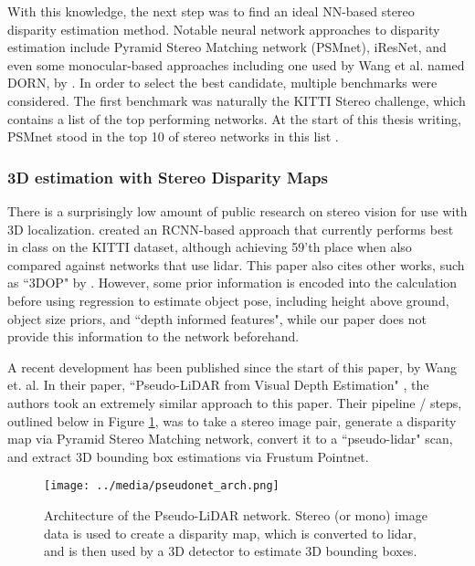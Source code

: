 With this knowledge, the next step was to find an ideal NN-based stereo disparity estimation method. Notable neural network approaches to disparity estimation include Pyramid Stereo Matching network (PSMnet),  iResNet, and even some monocular-based approaches including one used by Wang et al. named DORN, by  \cite{fu_deep_2018}. In order to select the best candidate, multiple benchmarks were considered. The first benchmark was naturally the KITTI Stereo challenge, which contains a list of the top performing networks. At the start of this thesis writing, PSMnet stood in the top 10 of stereo networks in this list \cite{menze_kitti_2019}.

\subsubsection{3D estimation with Stereo Disparity Maps}
There is a surprisingly low amount of public research on stereo vision for use with 3D localization. \cite{li_stereo_2019} created an RCNN-based approach that currently performs best in class on the KITTI dataset, although achieving 59'th place when also compared against networks that use lidar. This paper also cites other works, such as ``3DOP" by \cite{chen_3d_2016}. However, some prior information is encoded into the calculation before using regression to estimate object pose, including height above ground, object size priors, and ``depth informed features", while our paper does not provide this information to the network beforehand.

A recent development has been published since the start of this paper, by Wang et. al. In their paper, ``Pseudo-LiDAR from Visual Depth Estimation" \cite{wang_pseudo-lidar_2019}, the authors took an extremely similar approach to this paper. Their pipeline / steps, outlined below in Figure \ref{pseudonet_arch}, was to take a stereo image pair, generate a disparity map via Pyramid Stereo Matching network, convert it to a ``pseudo-lidar" scan, and extract 3D bounding box estimations via Frustum Pointnet. \\

\begin{figure}[ht]
    \texttt{[image: ../media/pseudonet\_arch.png]}
    \caption{Architecture of the Pseudo-LiDAR network. Stereo (or mono) image data is used to create a disparity map, which is converted to lidar, and is then used by a 3D detector to estimate 3D bounding boxes.}
    \label{pseudonet_arch}
\end{figure}

